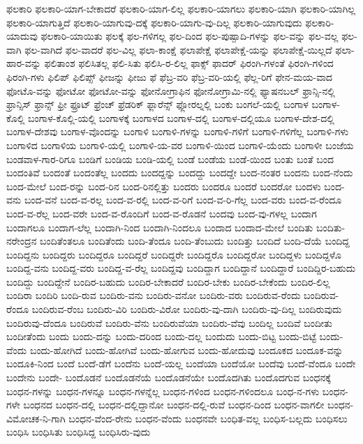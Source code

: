 {ಫಲಕಾರಿ
ಫಲಕಾರಿ-ಯಾಗ-ಬೇಕಾದರೆ
ಫಲಕಾರಿ-ಯಾಗ-ಲಿಲ್ಲ
ಫಲಕಾರಿ-ಯಾಗಲು
ಫಲಕಾರಿ-ಯಾಗಿ
ಫಲಕಾರಿ-ಯಾಗಿಲ್ಲ
ಫಲಕಾರಿ-ಯಾಗುತ್ತಿದೆ
ಫಲಕಾರಿ-ಯಾಗುವು-ದಕ್ಕೆ
ಫಲಕಾರಿ-ಯಾಗು-ವು-ದಿಲ್ಲ
ಫಲಕಾರಿ-ಯಾಗುವುದು
ಫಲಕಾರಿ-ಯಾದುವು
ಫಲಕಾರಿ-ಯಾಯಿತು
ಫಲಕ್ಕೆ
ಫಲ-ಗಳಿಗಲ್ಲ
ಫಲ-ದಿಂದ
ಫಲ-ಪುಷ್ಪಾದಿ-ಗಳನ್ನು
ಫಲ-ವನ್ನು
ಫಲ-ವಲ್ಲ
ಫಲ-ವಾಗಿ
ಫಲ-ವಾಗಿದೆ
ಫಲ-ವಾದರೆ
ಫಲ-ವಿಲ್ಲ
ಫಲಾ-ಕಾಂಕ್ಷೆ
ಫಲಾಪೇಕ್ಷೆ
ಫಲಾಪೇಕ್ಷೆ-ಯನ್ನು
ಫಲಾಪೇಕ್ಷೆ-ಯಿಲ್ಲದೆ
ಫಲಾ-ಹಾರ-ವನ್ನು
ಫಲಿತಾಂಶ
ಫಲಿಸಿತಲ್ಲ
ಫಲಿ-ಸಿತು
ಫಲಿಸಿ-ರ-ಲಿಲ್ಲ
ಫಾಕ್ಸ್
ಫಾದರ್
ಫಿರಂಗಿ-ಗಳಂತೆ
ಫಿರಂಗಿ-ಗಳಿಂದ
ಫಿರಂಗಿ-ಗಳು
ಫಿಲಿಪ್
ಫಿಲಿಪ್ಸ್
ಫೀಜನ್ನು
ಫೀಜು
ಫೆ
ಫೆಬ್ರ-ವರಿ
ಫೆಬ್ರ-ವರಿ-ಯಲ್ಲಿ
ಫೆಲ್ಲ-ರಿಗೆ
ಫೇನ-ಮಯ-ವಾದ
ಫೋಟೊ-ವನ್ನು
ಫೋಟೋ
ಫೋಟೋ-ವನ್ನು
ಫೋನೋಗ್ರಾಫಿನ
ಫೋನೋಗ್ರಾಮಿ-ನಲ್ಲಿ
ಫ್ಯಾಷನಬಲ್
ಫ್ರಾನ್ಸಿ-ನಲ್ಲಿ
ಫ್ರಾನ್ಸಿಸ್
ಫ್ರಾನ್ಸ್
ಫ್ರೀ
ಫ್ರೂಟ್
ಫ್ರೆಂಚ್
ಫ್ರೆಡರಿಕ್
ಫ್ಲಾರೆನ್ಸ್
ಫ್ಲೋರಲ್ನಲ್ಲಿ
ಬಂಕು
ಬಂಗಲೆ-ಯಲ್ಲಿ
ಬಂಗಾಳ
ಬಂಗಾಳ-ಕೊಲ್ಲಿ
ಬಂಗಾಳ-ಕೊಲ್ಲಿ-ಯಲ್ಲಿ
ಬಂಗಾಳಕ್ಕೆ
ಬಂಗಾಳದ
ಬಂಗಾಳ-ದಲ್ಲಿ
ಬಂಗಾಳ-ದಲ್ಲಿಯೂ
ಬಂಗಾಳ-ದೇಶ-ದಲ್ಲಿ
ಬಂಗಾಳ-ದೇಶವು
ಬಂಗಾಳ-ವೊಂದನ್ನು
ಬಂಗಾಳಿ
ಬಂಗಾಳಿ-ಗಳನ್ನು
ಬಂಗಾಳಿ-ಗಳಿಗೆ
ಬಂಗಾಳಿ-ಗಳಿಗೆಲ್ಲ
ಬಂಗಾಳಿ-ಗಳು
ಬಂಗಾಳಿದ
ಬಂಗಾಳಿಯ
ಬಂಗಾಳಿ-ಯಲ್ಲಿ
ಬಂಗಾಳಿ-ಯ-ವರ
ಬಂಗಾಳಿ-ಯಿಂದ
ಬಂಗಾಳಿ-ಯೆಂದು
ಬಂಗಾಳೀ
ಬಂಜೆಯ
ಬಂಡವಾಳ-ಗಾರ-ರಿಗೂ
ಬಂಡಿಗೆ
ಬಂಡಿಯ
ಬಂಡಿ-ಯಲ್ಲಿ
ಬಂಡೆ
ಬಂಡೆಯ
ಬಂಡೆ-ಯಿಂದ
ಬಂತು
ಬಂತೆ
ಬಂದ
ಬಂದಂತಿವೆ
ಬಂದಂತೆ
ಬಂದಂತೆಲ್ಲ
ಬಂದದು
ಬಂದದ್ದನ್ನು
ಬಂದದ್ದು
ಬಂದದ್ದೇ
ಬಂದ-ನಂತರ
ಬಂದನು
ಬಂದ-ನೆಂದು
ಬಂದ-ಮೇಲೆ
ಬಂದ-ರನ್ನು
ಬಂದ-ರಿನ
ಬಂದ-ರಿನಲ್ಲಿತ್ತು
ಬಂದರು
ಬಂದರೂ
ಬಂದರೆ
ಬಂದರೋ
ಬಂದಳು
ಬಂದ-ವನು
ಬಂದ-ವನೆ
ಬಂದ-ವ-ರಲ್ಲ
ಬಂದ-ವ-ರಲ್ಲಿ
ಬಂದ-ವ-ರಿಗೆ
ಬಂದ-ವ-ರಿ-ಗೆಲ್ಲ
ಬಂದ-ವರು
ಬಂದ-ವ-ರೆಂದೂ
ಬಂದ-ವ-ರೆಲ್ಲ
ಬಂದ-ವರೇ
ಬಂದ-ವ-ರೊಂದಿಗೆ
ಬಂದ-ವ-ರೊಡನೆ
ಬಂದವು
ಬಂದ-ವು-ಗಳಲ್ಲ
ಬಂದಾಗ
ಬಂದಾಗಲೂ
ಬಂದಾಗ-ಲೆಲ್ಲ
ಬಂದಾಗಿ-ನಿಂದ
ಬಂದಾಗಿ-ನಿಂದಲೂ
ಬಂದಾದ
ಬಂದಾದ-ಮೇಲೆ
ಬಂದಿತು
ಬಂದಿತು-ನರೇಂದ್ರನ
ಬಂದಿತೆಂತಲೂ
ಬಂದಿತೆಂದು
ಬಂದಿ-ತೆಂದೂ
ಬಂದಿ-ತೆಂಬುದು
ಬಂದಿತ್ತು
ಬಂದಿದೆ
ಬಂದಿ-ದೆಯೆ
ಬಂದಿದ್ದ
ಬಂದಿದ್ದನು
ಬಂದಿದ್ದರು
ಬಂದಿದ್ದರೂ
ಬಂದಿದ್ದರೆ
ಬಂದಿದ್ದರೇ
ಬಂದಿದ್ದರೊ
ಬಂದಿದ್ದರೋ
ಬಂದಿದ್ದಳು
ಬಂದಿದ್ದಳೊ
ಬಂದಿದ್ದ-ವನು
ಬಂದಿದ್ದ-ವರು
ಬಂದಿದ್ದ-ವ-ರೆಲ್ಲ
ಬಂದಿದ್ದವು
ಬಂದಿದ್ದಾಗ
ಬಂದಿದ್ದಾನೆ
ಬಂದಿದ್ದಾರೆ
ಬಂದಿದ್ದಿರ-ಬಹುದು
ಬಂದಿದ್ದು
ಬಂದಿದ್ದೇನೆ
ಬಂದಿರ-ಬಹುದು
ಬಂದಿರ-ಬೇಕಾದರೆ
ಬಂದಿರ-ಬೇಕು
ಬಂದಿರ-ಬೇಕೆಂದು
ಬಂದಿರ-ಲಿಲ್ಲ
ಬಂದಿರಾ
ಬಂದಿರಿ
ಬಂದಿ-ರುವ
ಬಂದಿರು-ವನು
ಬಂದಿರು-ವನೋ
ಬಂದಿರು-ವರು
ಬಂದಿರುವ-ರೆಂದು
ಬಂದಿರುವ-ರೆಂದೂ
ಬಂದಿರುವ-ರೆಂಬ
ಬಂದಿರು-ವಿರಿ
ಬಂದಿರು-ವಿರೋ
ಬಂದಿರು-ವು-ದಾಗಿ
ಬಂದಿರು-ವು-ದಿಲ್ಲ
ಬಂದಿರುವುದು
ಬಂದಿರುವು-ದೆಂದೂ
ಬಂದಿರುವೆ
ಬಂದಿರು-ವೆನು
ಬಂದಿರುವೆಯಾ
ಬಂದಿರು-ವೆವು
ಬಂದಿಲ್ಲ
ಬಂದಿವೆ
ಬಂದೀತು
ಬಂದೀತೆಂದು
ಬಂದು
ಬಂದು-ದನ್ನು
ಬಂದು-ದರಿಂದ
ಬಂದು-ದಲ್ಲ
ಬಂದುದು
ಬಂದು-ಬಿಟ್ಟ
ಬಂದು-ಬಿಟ್ಟೆ
ಬಂದು-ವೆಂದು
ಬಂದು-ಹೋಗಿದೆ
ಬಂದು-ಹೋಗಿವೆ
ಬಂದು-ಹೋಗುವ
ಬಂದು-ಹೋದುವು
ಬಂದೂಕದ
ಬಂದೂಕ-ವನ್ನು
ಬಂದೂಕಿ-ನಿಂದ
ಬಂದೆ
ಬಂದೆ-ಡೆಗೆ
ಬಂದೆನು
ಬಂದೆ-ಯಲ್ಲ
ಬಂದೆಯಾ
ಬಂದೆಯೋ
ಬಂದೆವು
ಬಂದೆ-ವೆಂದೂ
ಬಂದೇ
ಬಂದೇನು
ಬಂದೇ-
ಬಂದೊಡನೆ
ಬಂದೊಡನೆಯೆ
ಬಂದೊಡನೆಯೇ
ಬಂದೊದಗಿತು
ಬಂದೊದಗುವ
ಬಂಧನಕ್ಕೆ
ಬಂಧನ-ಗಳನ್ನು
ಬಂಧನ-ಗಳನ್ನೂ
ಬಂಧನ-ಗಳನ್ನೆಲ್ಲ
ಬಂಧನ-ಗಳಿಂದ
ಬಂಧನ-ಗಳಿಂದಲೂ
ಬಂಧ-ನ-ಗಳು
ಬಂಧನ-ಗಳೇ
ಬಂಧನದ
ಬಂಧನ-ದಲ್ಲಿ
ಬಂಧನ-ದಲ್ಲಿದ್ದಾನೋ
ಬಂಧನ-ದಲ್ಲಿ-ರುವೆ
ಬಂಧನ-ದಿಂದ
ಬಂಧನ-ವಾಗಲೀ
ಬಂಧನ-ವಿಮೋಚಕ-ನಿ-ಗಾಗಿ
ಬಂಧನ-ವೆಂದ-ರೇನು
ಬಂಧನ-ವೆಂದು
ಬಂಧನವೇ
ಬಂಧಿತ-ವಲ್ಲ
ಬಂಧಿಸ-ಬಲ್ಲದು
ಬಂಧಿಸಲು
ಬಂಧಿಸಿ
ಬಂಧಿಸಿತು
ಬಂಧಿಸಿದ್ದ
ಬಂಧಿಸಿರು-ವುದು
}
